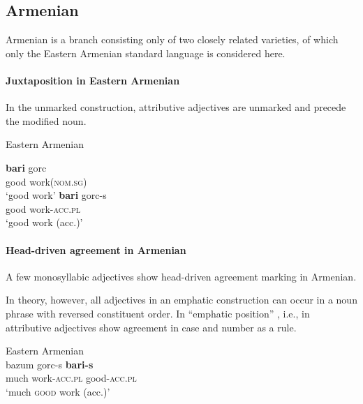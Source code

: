 \subsection{Armenian}
\label{armenian-synch}
Armenian is a branch consisting only of two closely related varieties, of which only the Eastern Armenian standard language is considered here.

\paragraph*{Juxtaposition in Eastern Armenian} 
In the unmarked construction, attributive adjectives are unmarked and precede the modified noun.
\begin{exe}
\ex \rm{Eastern Armenian \citep{ajello1998}}
\begin{xlist}
\ex 
\gll	\textbf{bari} gorc\\
	good work(\textsc{nom.sg})\\
\glt	‘good work’
\ex 
\gll	\textbf{bari} gorc-s\\
	good work-\textsc{acc.pl}\\
\glt	‘good work (acc.)’
\end{xlist}
\end{exe}

\paragraph*{Head\hyp{}driven agreement in Armenian}
A few monosyllabic adjectives show head\hyp{}driven agreement marking in Armenian. 

In theory, however, all adjectives in an emphatic construction can occur in a noun phrase with reversed constituent order. In “emphatic position” \cite[224]{ajello1998}, i.e., in  attributive adjectives show agreement in case and number as a rule.
\begin{exe}
\ex \rm{Eastern Armenian \citep[224]{ajello1998}}\\
\gll	bazum gorc-s \textbf{bari-s}\\
	much work-\textsc{acc.pl} good-\textsc{acc.pl}\\
\glt	‘much \textsc{good} work (acc.)’
\end{exe}

